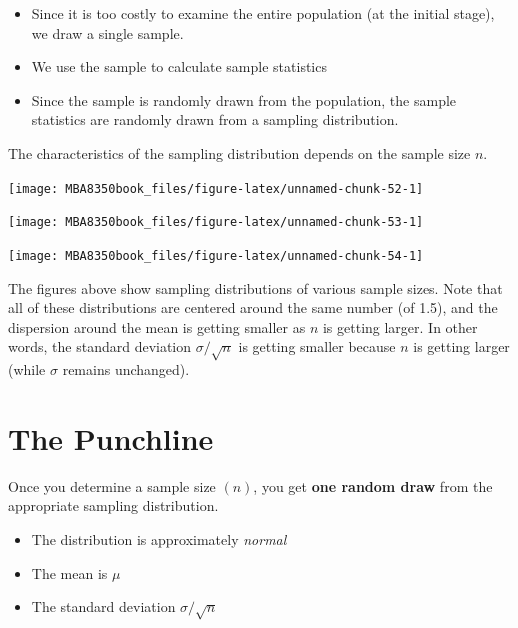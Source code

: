 \documentclass[
]{book}
\begin{document}
\begin{itemize}
\item
  Since it is too costly to examine the entire population (at the initial stage), we draw a single sample.
\item
  We use the sample to calculate sample statistics
\item
  Since the sample is randomly drawn from the population, the sample statistics are randomly drawn from a sampling distribution.
\end{itemize}

The characteristics of the sampling distribution depends on the sample size \(n\).

\begin{center}\texttt{[image: MBA8350book\_files/figure-latex/unnamed-chunk-52-1]} \end{center}

\begin{center}\texttt{[image: MBA8350book\_files/figure-latex/unnamed-chunk-53-1]} \end{center}

\begin{center}\texttt{[image: MBA8350book\_files/figure-latex/unnamed-chunk-54-1]} \end{center}

The figures above show sampling distributions of various sample sizes. Note that all of these distributions are centered around the same number (of 1.5), and the dispersion around the mean is getting smaller as \(n\) is getting larger. In other words, the standard deviation \(\sigma / \sqrt{n}\) is getting smaller because \(n\) is getting larger (while \(\sigma\) remains unchanged).

\hypertarget{the-punchline-1}{%
\section{The Punchline}\label{the-punchline-1}}

Once you determine a sample size \((n)\), you get \textbf{one random draw} from the appropriate sampling distribution.

\begin{itemize}
\item
  The distribution is approximately \emph{normal}
\item
  The mean is \(\mu\)
\item
  The standard deviation \(\sigma/\sqrt{n}\)
\end{itemize}
\end{document}

